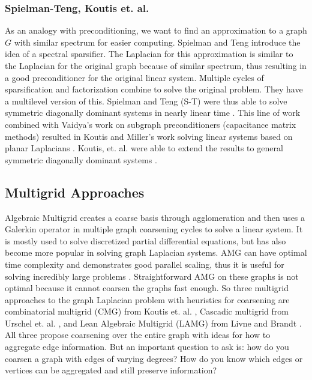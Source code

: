 \documentclass{article}
\begin{document}
\subsubsection{Spielman-Teng, Koutis et. al.}
As an analogy with preconditioning, we want to find an approximation to a graph $G$ with similar spectrum for easier computing. Spielman and Teng introduce the idea of a spectral sparsifier. The Laplacian for this approximation is similar to the Laplacian for the original graph because of similar spectrum, thus resulting in a good preconditioner for the original linear system. Multiple cycles of sparsification and factorization combine to solve the original problem. They have a multilevel version of this. Spielman and Teng (S-T) were thus able to solve symmetric diagonally dominant systems in nearly linear time \cite{Spielman:2008}.  This line of work combined with Vaidya's \cite{Vaidya:1991} work on subgraph preconditioners (capacitance matrix methods) resulted in Koutis and Miller's work solving linear systems based on planar Laplacians \cite{Koutis:2007}. Koutis, et. al. were able to extend the results to general symmetric diagonally dominant systems \cite{Koutis:2010}.

\subsection{Multigrid Approaches}
Algebraic Multigrid creates a coarse basis through agglomeration and then uses a Galerkin operator in multiple graph coarsening cycles to solve a linear system. It is mostly used to solve discretized partial differential equations, but has also become more popular in solving graph Laplacian systems. AMG can have optimal time complexity and demonstrates good parallel scaling, thus it is useful for solving incredibly large problems \cite{Livne:2012}. Straightforward AMG on these graphs is not optimal because it cannot coarsen the graphs fast enough. So three multigrid approaches to the graph Laplacian problem with heuristics for coarsening are combinatorial multigrid (CMG) from Koutis et. al. \cite{Koutis:2011}, Cascadic multigrid from Urschel et. al. \cite{Urschel:2014}, and Lean Algebraic Multigrid (LAMG) from Livne and Brandt \cite{Livne:2012}. All three propose coarsening over the entire graph with ideas for how to aggregate edge information. But an important question to ask is: how do you coarsen a graph with edges of varying degrees? How do you know which edges or vertices can be aggregated and still preserve information?
\end{document}

